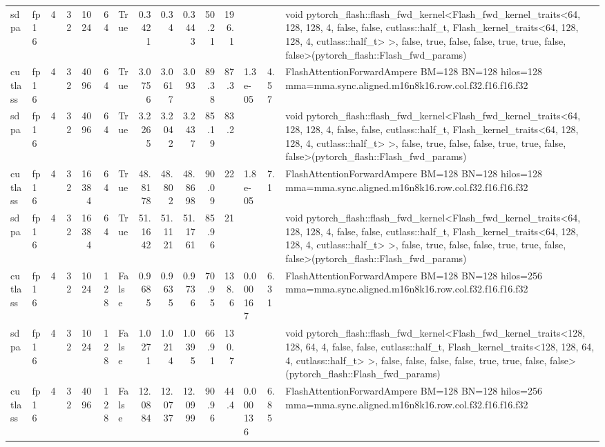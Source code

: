 \begin{table}[htbp]
\begin{tabular}{llrrrrlrrrrrlll}
    sdpa & fp16 & 4 & 32 & 1024 & 64 & True & 0.3421 & 0.34 & 0.3443 & 50.21 & 196.1 &  &  & void pytorch\_flash::flash\_fwd\_kernel<Flash\_fwd\_kernel\_traits<64, 128, 128, 4, false, false, cutlass::half\_t, Flash\_kernel\_traits<64, 128, 128, 4, cutlass::half\_t> >, false, true, false, false, true, true, false, false>(pytorch\_flash::Flash\_fwd\_params) \\
    cutlass & fp16 & 4 & 32 & 4096 & 64 & True & 3.0756 & 3.0617 & 3.093 & 89.38 & 87.3 & 1.3e-05 & 4.57 & FlashAttentionForwardAmpere BM=128 BN=128 hilos=128 mma=mma.sync.aligned.m16n8k16.row.col.f32.f16.f16.f32 \\
    sdpa & fp16 & 4 & 32 & 4096 & 64 & True & 3.2265 & 3.2042 & 3.2437 & 85.19 & 83.2 &  &  & void pytorch\_flash::flash\_fwd\_kernel<Flash\_fwd\_kernel\_traits<64, 128, 128, 4, false, false, cutlass::half\_t, Flash\_kernel\_traits<64, 128, 128, 4, cutlass::half\_t> >, false, true, false, false, true, true, false, false>(pytorch\_flash::Flash\_fwd\_params) \\
    cutlass & fp16 & 4 & 32 & 16384 & 64 & True & 48.8178 & 48.802 & 48.8698 & 90.09 & 22 & 1.8e-05 & 7.1 & FlashAttentionForwardAmpere BM=128 BN=128 hilos=128 mma=mma.sync.aligned.m16n8k16.row.col.f32.f16.f16.f32 \\
    sdpa & fp16 & 4 & 32 & 16384 & 64 & True & 51.1642 & 51.1121 & 51.1761 & 85.96 & 21 &  &  & void pytorch\_flash::flash\_fwd\_kernel<Flash\_fwd\_kernel\_traits<64, 128, 128, 4, false, false, cutlass::half\_t, Flash\_kernel\_traits<64, 128, 128, 4, cutlass::half\_t> >, false, true, false, false, true, true, false, false>(pytorch\_flash::Flash\_fwd\_params) \\
    cutlass & fp16 & 4 & 32 & 1024 & 128 & False & 0.9685 & 0.9635 & 0.9736 & 70.95 & 138.6 & 0.000167 & 6.31 & FlashAttentionForwardAmpere BM=128 BN=128 hilos=256 mma=mma.sync.aligned.m16n8k16.row.col.f32.f16.f16.f32 \\
    sdpa & fp16 & 4 & 32 & 1024 & 128 & False & 1.0271 & 1.0214 & 1.0395 & 66.91 & 130.7 &  &  & void pytorch\_flash::flash\_fwd\_kernel<Flash\_fwd\_kernel\_traits<128, 128, 64, 4, false, false, cutlass::half\_t, Flash\_kernel\_traits<128, 128, 64, 4, cutlass::half\_t> >, false, false, false, false, true, true, false, false>(pytorch\_flash::Flash\_fwd\_params) \\
    cutlass & fp16 & 4 & 32 & 4096 & 128 & False & 12.0884 & 12.0737 & 12.0999 & 90.96 & 44.4 & 0.000136 & 6.85 & FlashAttentionForwardAmpere BM=128 BN=128 hilos=256 mma=mma.sync.aligned.m16n8k16.row.col.f32.f16.f16.f32 \\

\end{tabular}
\end{table}
